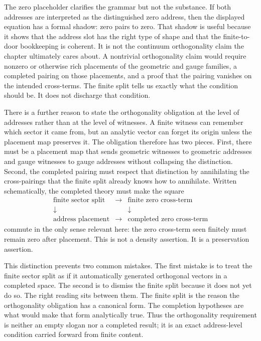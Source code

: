 The zero placeholder clarifies the grammar but not the substance. If both
addresses are interpreted as the distinguished zero address, then the displayed
equation has a formal shadow: zero pairs to zero. That shadow is useful because
it shows that the address slot has the right type of shape and that the
finite-to-door bookkeeping is coherent. It is not the continuum orthogonality
claim the chapter ultimately cares about. A nontrivial orthogonality claim
would require nonzero or otherwise rich placements of the geometric and gauge
families, a completed pairing on those placements, and a proof that the pairing
vanishes on the intended cross-terms. The finite split tells us exactly what
the condition should be. It does not discharge that condition.

There is a further reason to state the orthogonality obligation at the level of
addresses rather than at the level of witnesses. A finite witness can remember
which sector it came from, but an analytic vector can forget its origin unless
the placement map preserves it. The obligation therefore has two pieces. First,
there must be a placement map that sends geometric witnesses to geometric
addresses and gauge witnesses to gauge addresses without collapsing the
distinction. Second, the completed pairing must respect that distinction by
annihilating the cross-pairings that the finite split already knows how to
annihilate. Written schematically, the completed theory must make the square
\[
  \begin{array}{ccc}
  \text{finite sector split} & \longrightarrow & \text{finite zero cross-term} \\
  \downarrow & & \downarrow \\
  \text{address placement} & \longrightarrow & \text{completed zero cross-term}
  \end{array}
\]
commute in the only sense relevant here: the zero cross-term seen finitely must
remain zero after placement. This is not a density assertion. It is a
preservation assertion.

This distinction prevents two common mistakes. The first mistake is to treat
the finite sector split as if it automatically generated orthogonal vectors in
a completed space. The second is to dismiss the finite split because it does
not yet do so. The right reading sits between them. The finite split is the
reason the orthogonality obligation has a canonical form. The completion
hypotheses are what would make that form analytically true. Thus the
orthogonality requirement is neither an empty slogan nor a completed result; it
is an exact address-level condition carried forward from finite content.

